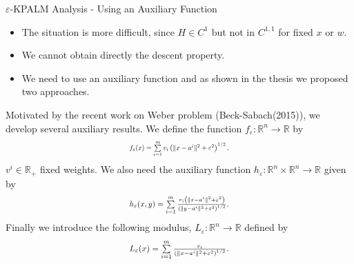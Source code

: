 \documentclass[9pt]{beamer}
\newenvironment{displaybox}[1]
{
  \centerline\bgroup\hfill
  \begin{beamerboxesrounded}[lower=default,shadow=true,width=#1]{}
}
{
  \end{beamerboxesrounded}\hfill\egroup
}
\newcommand{\rr}{\mathbb{R}} %
\begin{document}
	\begin{frame}{$\varepsilon$-KPALM Analysis - Using an Auxiliary Function}
		\begin{itemize}[<+->]
			\item The situation is more difficult, since $H \in C^1$ but not in $C^{1,1}$ for fixed $x$ or $w$.\vspace{0.03in}
			\item We cannot obtain directly the descent property.\vspace{0.03in}
			\item We need to use an auxiliary function and as shown in the thesis we proposed two approaches.\vspace{0.03in}
		\end{itemize}
		\pause
		\begin{displaybox}{11cm}
			Motivated by the recent work on Weber problem {\dblue (Beck-Sabach(2015))}, we develop several auxiliary results. We define the function $f_{\varepsilon}: \mathbb{R}^n \rightarrow \mathbb{R}$ by
			\begin{equation*}
				\resizebox{.3\hsize}{!}{$f_{\varepsilon}(x) = \sum\limits_{i=1}^{m} v_i \left( \|x - a^i\|^2 + {\varepsilon}^2 \right)^{1/2},$}
			\end{equation*}
			$v^i \in \rr_+$ fixed weights. We also need the auxiliary function $h_{\varepsilon}: \mathbb{R}^n \times \mathbb{R}^n \rightarrow \mathbb{R}$ given by
			\begin{equation*}
				\resizebox{.3\hsize}{!}{$h_{\varepsilon}(x,y) = \sum\limits_{i=1}^m \frac{v_i \left( \|x-a^i\|^2 + {\varepsilon}^2 \right)}{\left( \|y-a^i\|^2 + {\varepsilon}^2 \right)^{1/2}}.$}
			\end{equation*}
			Finally we introduce the following modulus, $L_{\varepsilon}: \mathbb{R}^n \rightarrow \mathbb{R}$ defined by
			\begin{equation*}
				\resizebox{.3\hsize}{!}{$L_{\varepsilon}(x) = \sum\limits_{i=1}^{m}\frac{v_i}{\left( \|x - a^i\|^2 + {\varepsilon}^2 \right)^{1/2}}.$}
			\end{equation*}
		\end{displaybox}
	\end{frame}
	
\end{document}
